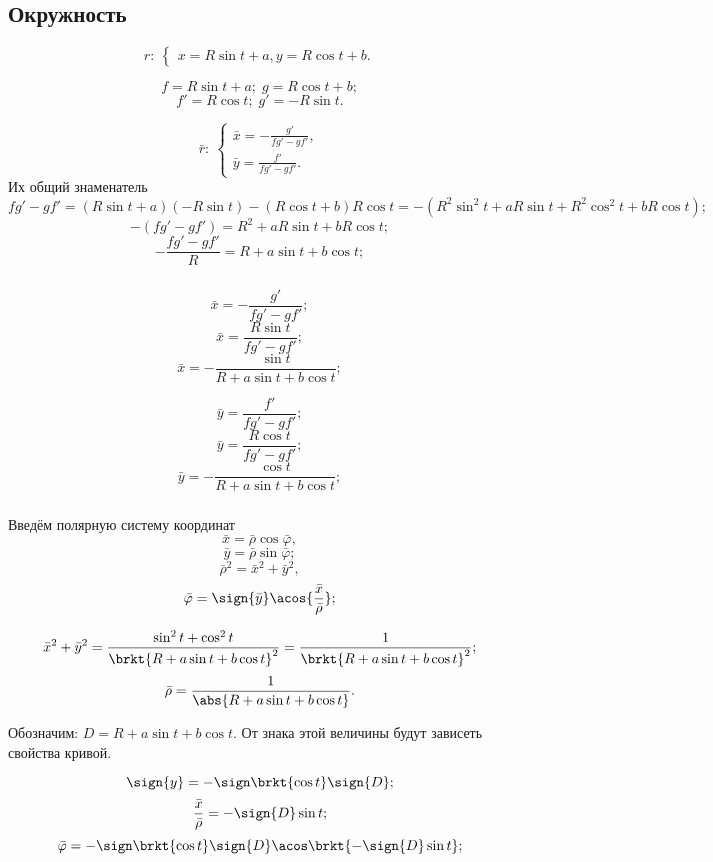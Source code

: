 \subsection{Окружность}
$$r: \: 
\left\{ \begin{gathered}
	x = R\sin{t}+a,
	y = R\cos{t}+b.
\end{gathered} \right.
$$

$$f = R\sin{t}+a; \; g = R\cos{t}+b;$$
$$f' = R\cos{t}; \; g' = -R\sin{t}.$$

$$\bar{r}:
\:
\left\{
\begin{gathered}
	\bar{x} =  -\frac{g'}{f g' - g f'},\\
	\bar{y} =  \frac{f'}{f g' - g f'}.
\end{gathered}
\right.
$$
Их общий знаменатель 
$$f g' - g f' = (R\sin{t}+a)(-R\sin{t}) - (R\cos{t}+b) R\cos{t} = -\left(R^2\sin^2{t}+aR\sin{t} + R^2\cos^2{t} +bR\cos{t}\right);$$
$$-(f g' - g f') = R^2 + aR\sin{t} + bR\cos{t};$$
$$-\frac{f g' - g f'}{R} = R + a\sin{t} + b\cos{t};$$

\subparagraph{}
\begin{minipage}{0.4\textwidth}
$$\bar{x} =  -\frac{g'}{f g' - g f'};$$
$$\bar{x} =  \frac{R \sin{t}}{f g' - g f'};$$
$$\bar{x} =  -\frac{\sin{t}}{R + a\sin{t} + b\cos{t}};$$

\end{minipage}
\begin{minipage}{0.4\textwidth}
$$\bar{y} =  \frac{f'}{f g' - g f'};$$
$$\bar{y} =  \frac{R \cos{t}}{f g' - g f'};$$
$$\bar{y} =  -\frac{\cos{t}}{R + a\sin{t} + b\cos{t}};$$

\end{minipage}

\subparagraph{} Введём полярную систему координат
$$\bar{x} = \bar{\rho}\cos{\bar{\varphi}},$$
$$\bar{y} = \bar{\rho}\sin{\bar{\varphi}};$$
$$\bar{\rho}^2 = \bar{x}^2 + \bar{y}^2,$$
$$\bar{\varphi} = \sign{\bar{y}}\acos{\frac{\bar{x}}{\bar{\rho}}};$$

$$\bar{x}^2 + \bar{y}^2 
= \frac{\sin^2{t} + \cos^2{t}}{\brkt{R + a\sin{t} + b\cos{t}}^2}
= \frac{1}{\brkt{R + a\sin{t} + b\cos{t}}^2};$$
$$\bar{\rho} = \frac{1}{\abs{R + a\sin{t} + b\cos{t}}}.$$

Обозначим: $D = R + a\sin{t} + b\cos{t}$. От знака этой величины будут зависеть свойства кривой.

$$\sign{y} = -\sign\brkt{\cos{t}}\sign{D};$$
$$\frac{\bar{x}}{\bar{\rho}} = -\sign{D}\sin{t};$$
$$\bar{\varphi} = -\sign\brkt{\cos{t}}\sign{D}\acos\brkt{-\sign{D}\sin{t}};$$

